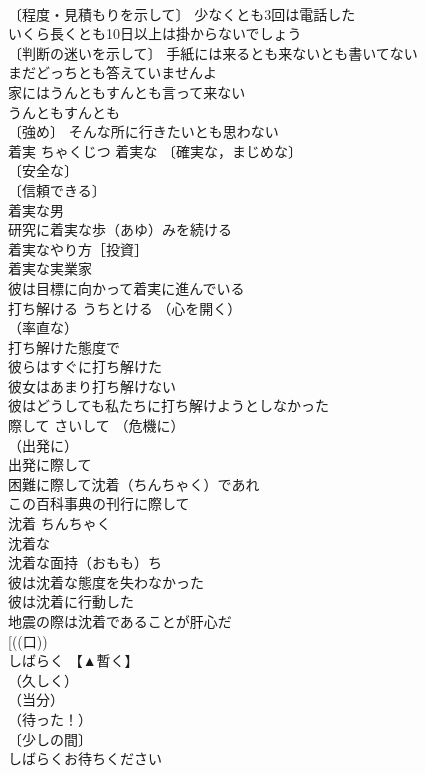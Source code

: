 \documentclass[8pt]{extreport}
\begin{document}
\begin{CJK}{UTF8}{min}
\\	〔程度・見積もりを示して〕 少なくとも3回は電話した 
\\	いくら長くとも10日以上は掛からないでしょう 
\\	〔判断の迷いを示して〕 手紙には来るとも来ないとも書いてない 
\\	まだどっちとも答えていませんよ 
\\	家にはうんともすんとも言って来ない
\\	うんともすんとも　
\\	〔強め〕 そんな所に行きたいとも思わない 
\\	着実	ちゃくじつ	着実な 〔確実な，まじめな〕
\\	〔安全な〕
\\	〔信頼できる〕
\\	着実な男 
\\	研究に着実な歩（あゆ）みを続ける 
\\	着実なやり方［投資］ 
\\	着実な実業家 
\\	彼は目標に向かって着実に進んでいる 
\\	打ち解ける	うちとける	（心を開く）
\\	（率直な）
\\	打ち解けた態度で 
\\	彼らはすぐに打ち解けた 
\\	彼女はあまり打ち解けない 
\\	彼はどうしても私たちに打ち解けようとしなかった 
\\	際して	さいして	（危機に）
\\	（出発に）
\\	出発に際して 
\\	困難に際して沈着（ちんちゃく）であれ 
\\	この百科事典の刊行に際して 
\\	沈着	ちんちゃく	
\\	沈着な 
\\	沈着な面持（おもも）ち 
\\	彼は沈着な態度を失わなかった 
\\	彼は沈着に行動した 
\\	地震の際は沈着であることが肝心だ 
\\	[((口))
\\	しばらく	【▲暫く】	
\\	（久しく）
\\	（当分）
\\	（待った！）
\\	〔少しの間〕
\\	しばらくお待ちください 

\end{CJK}
\end{document}
